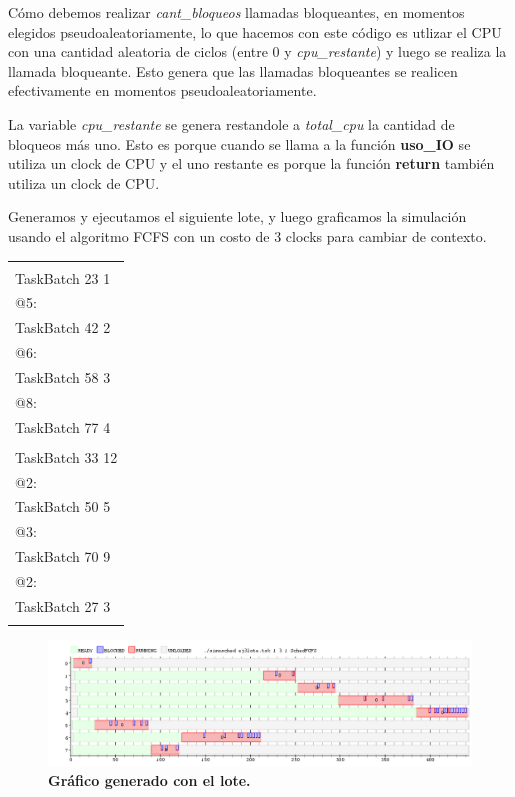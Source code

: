 Cómo debemos realizar \textit{cant\_bloqueos} llamadas bloqueantes, en momentos elegidos pseudoaleatoriamente, lo que hacemos con este código es utlizar el CPU con una cantidad aleatoria de ciclos (entre 0 y \textit{cpu\_restante}) y luego se realiza la llamada bloqueante. Esto genera que las llamadas bloqueantes se realicen efectivamente en momentos pseudoaleatoriamente.

La variable \textit{cpu\_restante} se genera restandole a \textit{total\_cpu} la cantidad de bloqueos más uno. Esto es porque cuando se llama a la función \textbf{uso\_IO} se utiliza un clock de CPU y el uno restante es porque la función \textbf{return} también utiliza un clock de CPU.

Generamos y ejecutamos el siguiente lote, y luego graficamos la simulación usando el algoritmo FCFS con un costo de 3 clocks para cambiar de contexto.

\begin{center}
	\begin{tabular}{|l|}
		\hline
							\\
		TaskBatch 23 1		\\
		@5: 				\\
		TaskBatch 42 2		\\
		@6:					\\
		TaskBatch 58 3		\\
		@8:					\\
		TaskBatch 77 4		\\
							\\
		TaskBatch 33 12		\\
		@2:					\\
		TaskBatch 50 5		\\
		@3:					\\
		TaskBatch 70 9		\\
		@2:					\\
		TaskBatch 27 3		\\
							\\
		\hline
	\end{tabular}
\end{center}

\begin{figure}[!h]
	\begin{center}
		\includegraphics[width=500px]{imagenes/ej3.png}
		\caption{\small{\textbf{Gráfico generado con el lote.}}}
		\label{fig:grafico_ej1}
	\end{center}
\end{figure}